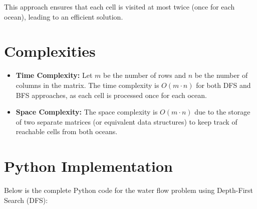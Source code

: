 This approach ensures that each cell is visited at most twice (once for each ocean), leading to an efficient solution.


\section*{Complexities}

\begin{itemize}
	\item \textbf{Time Complexity:} Let \(m\) be the number of rows and \(n\) be the number of columns in the matrix. The time complexity is \(O(m \cdot n)\) for both DFS and BFS approaches, as each cell is processed once for each ocean.
	
	\item \textbf{Space Complexity:} The space complexity is \(O(m \cdot n)\) due to the storage of two separate matrices (or equivalent data structures) to keep track of reachable cells from both oceans.
\end{itemize}

\newpage %
\section*{Python Implementation}


Below is the complete Python code for the water flow problem using Depth-First Search (DFS):

